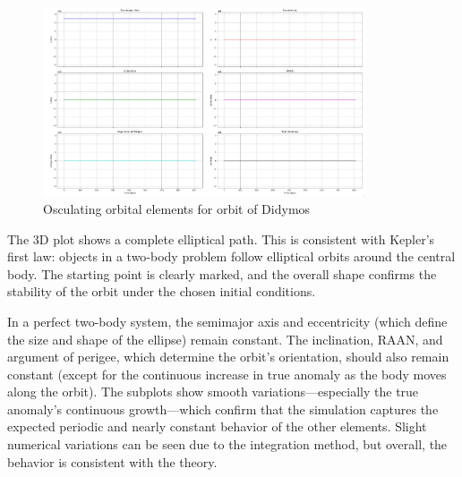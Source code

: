 \begin{hwkProblem}{2}{}
	\hwkPart

	\begin{figure}[H]
		\begin{center}
			\includegraphics[width=0.85\textwidth]{./images/s02c.png}
		\end{center}
		\caption{Osculating orbital elements for orbit of Didymos}\label{fig:s02c}
	\end{figure}

	The 3D plot shows a complete elliptical path. This is consistent with Kepler’s first law: objects in a two‐body problem follow elliptical orbits around the central body. The starting point is clearly marked, and the overall shape confirms the stability of the orbit under the chosen initial conditions.

	In a perfect two-body system, the semimajor axis and eccentricity (which define the size and shape of the ellipse) remain constant. The inclination, RAAN, and argument of perigee, which determine the orbit’s orientation, should also remain constant (except for the continuous increase in true anomaly as the body moves along the orbit). The subplots show smooth variations—especially the true anomaly’s continuous growth—which confirm that the simulation captures the expected periodic and nearly constant behavior of the other elements. Slight numerical variations can be seen due to the integration method, but overall, the behavior is consistent with the theory.

\end{hwkProblem}
